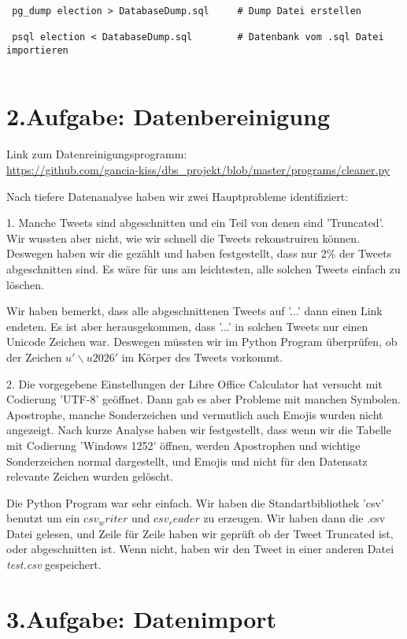 \begin{verbatim}
 pg_dump election > DatabaseDump.sql     # Dump Datei erstellen
 
 psql election < DatabaseDump.sql        # Datenbank vom .sql Datei importieren
 
\end{verbatim}



\section*{2.Aufgabe: Datenbereinigung}

Link zum Datenreinigungsprogramm: \\
\url{https://github.com/gancia-kiss/dbs_projekt/blob/master/programs/cleaner.py}

Nach tiefere Datenanalyse haben wir zwei Hauptprobleme identifiziert:

1. Manche Tweets sind abgeschnitten und ein Teil von denen sind 'Truncated'. Wir wussten aber nicht, wie wir schnell die Tweets rekonstruiren können. Deswegen haben wir die gezählt und haben festgestellt, dass nur 2\% der Tweets abgeschnitten sind. Es wäre für uns am leichtesten, alle solchen Tweets einfach zu löschen.

Wir haben bemerkt, dass alle abgeschnittenen Tweets auf '...' dann einen Link endeten. Es ist aber herausgekommen, dass '...' in solchen Tweets nur einen Unicode Zeichen war.  Deswegen müssten wir im Python Program überprüfen, ob der Zeichen \textit{$u'\backslash u2026'$} im Körper des Tweets vorkommt.

2. Die vorgegebene Einstellungen der Libre Office Calculator hat versucht mit Codierung 'UTF-8' geöffnet. Dann gab es aber Probleme mit manchen Symbolen. Apostrophe, manche Sonderzeichen und vermutlich auch Emojis wurden nicht angezeigt. Nach kurze Analyse haben wir festgestellt, dass wenn wir die Tabelle mit Codierung 'Windows 1252' öffnen, werden Apostrophen und wichtige Sonderzeichen normal dargestellt, und Emojis und nicht für den Datensatz relevante Zeichen wurden gelöscht.

Die Python Program war sehr einfach. Wir haben die Standartbibliothek 'csv' benutzt um ein $csv_writer$ und $csv_reader$ zu erzeugen. Wir haben dann die .csv Datei gelesen, und Zeile für Zeile haben wir geprüft ob der Tweet Truncated ist, oder abgeschnitten ist. Wenn nicht, haben wir den Tweet in einer anderen Datei \textit{test.csv} gespeichert. 

\section*{3.Aufgabe: Datenimport}

